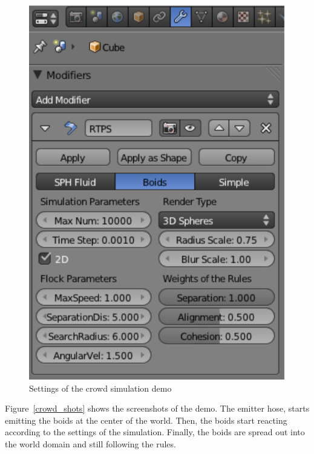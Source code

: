 \begin{figure}[htbp]
\begin{center}
\includegraphics[scale=0.8]{figures/demo_crowds_modifier.pdf}
\caption{Settings of the crowd simulation demo}
\label{crowd_modifier}
\end{center}
\end{figure}

Figure~\ref{crowd_shots} shows the screenshots of the demo. The emitter hose, starts emitting the boids at the center of the world. Then, the boids start reacting according to the settings of the simulation. Finally, the boids are spread out into the world domain and still following the rules.

